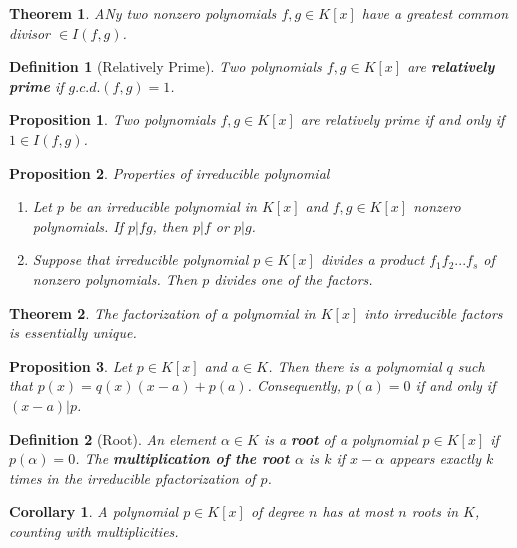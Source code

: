 \documentclass[12pt]{article}
\newtheorem{definition}{Definition}[subsection]
\newtheorem{theorem}{Theorem}[subsection]
\newtheorem{proposition}{Proposition}[subsection]
\newtheorem{corollary}{Corollary}[subsection]
\begin{document}
    \begin{theorem}
        ANy two nonzero polynomials $f,g \in K[x]$ have a greatest common divisor $\in I(f,g)$.
    \end{theorem}
    \begin{definition}[Relatively Prime]
        Two polynomials $f,g \in K[x]$ are \textbf{relatively prime} if $g.c.d.(f,g) = 1$.
    \end{definition}
    \begin{proposition}
        Two polynomials $f,g \in K[x]$ are relatively prime if and only if $1 \in I(f,g)$.
    \end{proposition}
    \begin{proposition}
        Properties of irreducible polynomial\\
        \begin{enumerate}
            \item Let $p$ be an irreducible polynomial in $K[x]$ and $f,g \in K[x]$ nonzero polynomials. If $p | fg$, then $p|f$ or $p|g$.
            \item Suppose that irreducible polynomial $p \in K[x]$ divides a product $f_1f_2...f_s$ of nonzero polynomials. Then $p$ divides one of the factors.
        \end{enumerate}
    \end{proposition}

    \begin{theorem}
        The factorization of a polynomial in $K[x]$ into irreducible factors is essentially unique.
    \end{theorem}

    \begin{proposition}
        Let $p \in K[x]$ and $a \in K$. Then there is a polynomial $q$ such that $p(x) = q(x)(x-a) + p(a)$. Consequently, $p(a) = 0$ if and only if $(x-a)|p$.
    \end{proposition}
    
    \begin{definition}[Root]
        An element $\alpha \in K$ is a \textbf{root} of a polynomial $p \in K[x]$ if $p(\alpha)=0$. The \textbf{multiplication of the root $\alpha$} is $k$ if $x-\alpha$ appears exactly $k$ times in the irreducible pfactorization of $p$.
    \end{definition}
    
    \begin{corollary}
        A polynomial $p \in K[x]$ of degree $n$ has at most $n$ roots in $K$, counting with multiplicities.
    \end{corollary}
\end{document}

